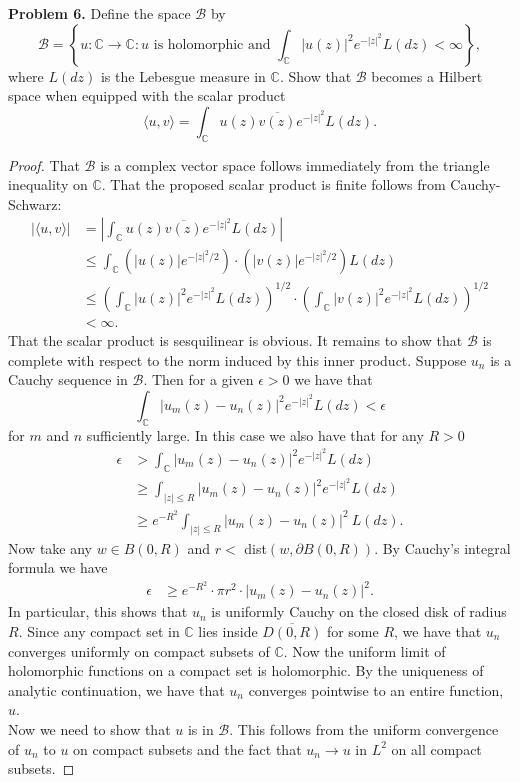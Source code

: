 \documentclass[11pt,letterpaper]{report}
\newcommand{\complex}{\mathbb{C}}
\newcommand{\mcal}[1]{\mathcal{#1}}
\begin{document}
\noindent\textbf{Problem 6. }Define the space $\mcal{B}$ by
\[
\mcal{B} = \left\{u:\complex\to \complex: u\text{ is holomorphic and }\int_\complex|u(z)|^2e^{-|z|^2}L(dz)<\infty\right\},
\]
where $L(dz)$ is the Lebesgue measure in $\complex$. Show that $\mcal{B}$ becomes a Hilbert space when equipped with the scalar product
\[
\langle u, v\rangle = \int_\complex u(z)\overline{v(z)}e^{-|z|^2} L(dz).
\]
\begin{proof}
	That $\mcal{B}$ is a complex vector space follows immediately from the triangle inequality on $\complex$. That the proposed scalar product is finite follows from Cauchy-Schwarz:
	\begin{align*}
		|\langle u, v\rangle| &= \left|\int_\complex u(z)\overline{v(z)}e^{-|z|^2}L(dz)\right|\\
		&\leq \int_\complex(|u(z)|e^{-|z|^2/2})\cdot (|v(z)|e^{-|z|^2/2})L(dz)\\
		&\leq \left(\int_\complex |u(z)|^2e^{-|z|^2}L(dz)\right)^{1/2}\cdot \left(\int_\complex |v(z)|^2e^{-|z|^2}L(dz)\right)^{1/2}\\
		&<\infty.
	\end{align*}
	That the scalar product is sesquilinear is obvious. It remains to show that $\mcal{B}$ is complete with respect to the norm induced by this inner product. Suppose $u_n$ is a Cauchy sequence in $\mcal{B}$. Then for a given $\epsilon>0$ we have that
	\[
	\int_\complex |u_m(z)-u_n(z)|^2 e^{-|z|^2}L(dz)<\epsilon
	\]
	for $m$ and $n$ sufficiently large. In this case we also have that for any $R>0$
	\begin{align*}
		\epsilon &> \int_\complex |u_m(z)-u_n(z)|^2 e^{-|z|^2}L(dz)\\
		&\geq \int_{|z|\leq R}|u_m(z)-u_n(z)|^2 e^{-|z|^2}L(dz)\\
		&\geq e^{-R^2}\int_{|z|\leq R}|u_m(z)-u_n(z)|^2\ L(dz).
	\end{align*}
	Now take any $w\in B(0, R)$ and $r<$ dist$(w, \partial B(0, R))$. By Cauchy's integral formula we have
	\begin{align*}
		\epsilon &\geq e^{-R^2}\cdot \pi r^2\cdot |u_m(z)-u_n(z)|^2.
	\end{align*}
	In particular, this shows that $u_n$ is uniformly Cauchy on the closed disk of radius $R$. Since any compact set in $\complex$ lies inside $\overline{D(0,R)}$ for some $R$, we have that $u_n$ converges uniformly on compact subsets of $\complex$. Now the uniform limit of holomorphic functions on a compact set is holomorphic. By the uniqueness of analytic continuation, we have that $u_n$ converges pointwise to an entire function, $u$.\\

	\noindent Now we need to show that $u$ is in $\mcal{B}$. This follows from the uniform convergence of $u_n$ to $u$ on compact subsets and the fact that $u_n\to u$ in $L^2$ on all compact subsets.
\end{proof}
\end{document}
